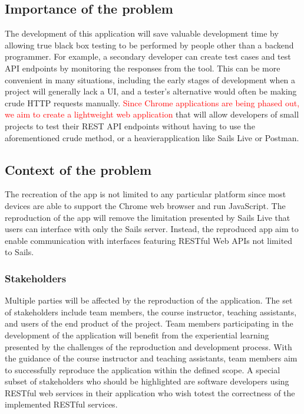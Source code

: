 \documentclass{article}
\begin{document}
\subsection{Importance​ ​of​ ​the​ ​problem }

The development of this application will save valuable development time by allowing true black box testing to be performed by people other than a backend programmer. For example, a secondary developer can create test cases and test API endpoints by monitoring the responses from the tool. This can be more convenient in many situations, including the early stages of development when a project will generally lack a UI, and a tester’s alternative would often be making crude HTTP requests manually.  \textcolor{red}{Since Chrome applications are being phased out, we aim to create a lightweight web application} that will allow developers of small projects to test their REST API endpoints without having to use the​ ​aforementioned​ ​crude​ ​method,​ ​or​ ​a​ ​heavier​ ​application​ ​like​ ​Sails​ ​Live​ ​or​ ​Postman. 

\newpage
\subsection{ Context​ ​of​ ​the​ ​problem }
The recreation of the app is not limited to any particular platform since most devices are able to support the Chrome web browser and run JavaScript. The reproduction of the app will remove the limitation presented by Sails Live that users can interface with only the Sails server. Instead, the reproduced app aim to enable communication with interfaces featuring RESTful Web APIs not​ ​limited​ ​to​ ​Sails. 

\subsubsection{ Stakeholders }
Multiple parties will be affected by the reproduction of the application. The set of stakeholders include team members, the course instructor, teaching assistants, and users of the end product of the project. Team members participating in the development of the application will benefit from the experiential learning presented by the challenges of the reproduction and development process. With the guidance of the course instructor and teaching assistants, team members aim to successfully reproduce the application within the defined scope. A special subset of stakeholders who should be highlighted are software developers using RESTful web services in their​ ​application​ ​who​ ​wish​ ​to​ ​test​ ​the​ ​correctness​ ​of​ ​the​ ​implemented​ ​RESTful​ ​services. 
\end{document}
